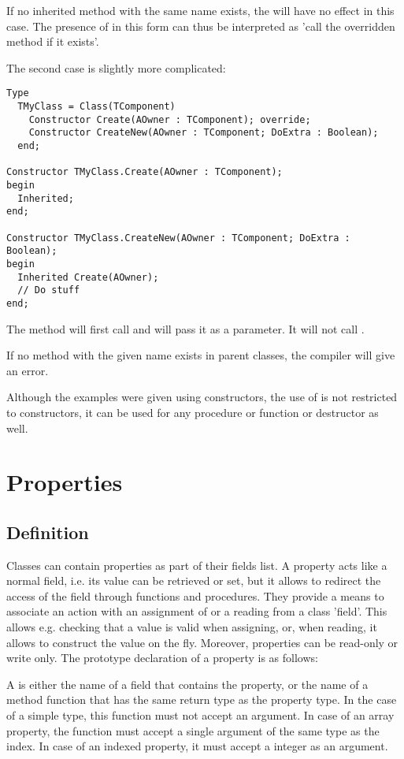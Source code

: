 If no inherited method with the same name exists, the  will have 
no effect in this case. The presence of  in this form can thus 
be interpreted as 'call the overridden method if it exists'.

The second case is slightly more complicated:
\begin{verbatim}
Type
  TMyClass = Class(TComponent)
    Constructor Create(AOwner : TComponent); override;
    Constructor CreateNew(AOwner : TComponent; DoExtra : Boolean);
  end;

Constructor TMyClass.Create(AOwner : TComponent); 
begin
  Inherited;
end;

Constructor TMyClass.CreateNew(AOwner : TComponent; DoExtra : Boolean); 
begin
  Inherited Create(AOwner);
  // Do stuff
end;
\end{verbatim}
The  method will first call  and
will pass it  as a parameter. It will not call
.

If no method with the given name exists in parent classes, the compiler will
give an error.

Although the examples were given using constructors, the use of
 is not restricted to constructors, it can be used
for any procedure or function or destructor as well.

\section{Properties}
\subsection{Definition}
Classes can contain properties as part of their fields list. A property
acts like a normal field, i.e. its value can be retrieved or set, but it
allows to redirect the access of the field through functions and
procedures. They provide a means to associate an action with an assignment
of or a reading from a class 'field'. This allows e.g. checking that a
value is valid when assigning, or, when reading, it allows to construct the
value on the fly. Moreover, properties can be read-only or write only.
The prototype declaration of a property is as follows:


A   is either the name of a field that contains the
property, or the name of a method function that has the same return type as
the property type. In the case of a simple type, this
function must not accept an argument. In case of an array property, the
function must accept a single argument of the same type as the index.
In case of an indexed property, it must accept a integer as an argument.

